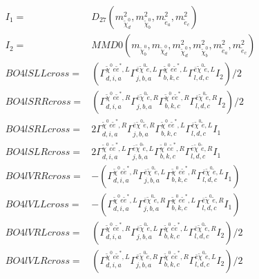 \documentclass[A4,landscape]{article}
\begin{document}
\begin{align} 
I_1 = & D_{27}(m^2_{\tilde{\chi}^0_{{d}}}, m^2_{\tilde{\chi}^0_{{b}}}, m^2_{\tilde{e}_{{a}}}, m^2_{\tilde{e}_{{c}}}) \\ 
I_2 = & MMD0(m_{\tilde{\chi}^0_{{b}}}, m_{\tilde{\chi}^0_{{d}}}, m^2_{\tilde{\chi}^0_{{d}}}, m^2_{\tilde{\chi}^0_{{b}}}, m^2_{\tilde{e}_{{a}}}, m^2_{\tilde{e}_{{c}}}) \\ 
  BO4lSLLcross= & ( \Gamma^{\tilde{\chi}^0 e \tilde{e}^*,L}_{d, i, a} \Gamma^{\bar{e}\tilde{\chi}^0 \tilde{e} ,L}_{j, b, a} \Gamma^{\tilde{\chi}^0 e \tilde{e}^*,L}_{b, k, c} \Gamma^{\bar{e}\tilde{\chi}^0 \tilde{e} ,L}_{l, d, c} I_2)/2 \\ 
  BO4lSRRcross= & ( \Gamma^{\tilde{\chi}^0 e \tilde{e}^*,R}_{d, i, a} \Gamma^{\bar{e}\tilde{\chi}^0 \tilde{e} ,R}_{j, b, a} \Gamma^{\tilde{\chi}^0 e \tilde{e}^*,R}_{b, k, c} \Gamma^{\bar{e}\tilde{\chi}^0 \tilde{e} ,R}_{l, d, c} I_2)/2 \\ 
  BO4lSRLcross= & 2  \Gamma^{\tilde{\chi}^0 e \tilde{e}^*,R}_{d, i, a} \Gamma^{\bar{e}\tilde{\chi}^0 \tilde{e} ,R}_{j, b, a} \Gamma^{\tilde{\chi}^0 e \tilde{e}^*,L}_{b, k, c} \Gamma^{\bar{e}\tilde{\chi}^0 \tilde{e} ,L}_{l, d, c} I_1 \\ 
  BO4lSLRcross= & 2  \Gamma^{\tilde{\chi}^0 e \tilde{e}^*,L}_{d, i, a} \Gamma^{\bar{e}\tilde{\chi}^0 \tilde{e} ,L}_{j, b, a} \Gamma^{\tilde{\chi}^0 e \tilde{e}^*,R}_{b, k, c} \Gamma^{\bar{e}\tilde{\chi}^0 \tilde{e} ,R}_{l, d, c} I_1 \\ 
  BO4lVRRcross= & -( \Gamma^{\tilde{\chi}^0 e \tilde{e}^*,R}_{d, i, a} \Gamma^{\bar{e}\tilde{\chi}^0 \tilde{e} ,L}_{j, b, a} \Gamma^{\tilde{\chi}^0 e \tilde{e}^*,R}_{b, k, c} \Gamma^{\bar{e}\tilde{\chi}^0 \tilde{e} ,L}_{l, d, c} I_1) \\ 
  BO4lVLLcross= & -( \Gamma^{\tilde{\chi}^0 e \tilde{e}^*,L}_{d, i, a} \Gamma^{\bar{e}\tilde{\chi}^0 \tilde{e} ,R}_{j, b, a} \Gamma^{\tilde{\chi}^0 e \tilde{e}^*,L}_{b, k, c} \Gamma^{\bar{e}\tilde{\chi}^0 \tilde{e} ,R}_{l, d, c} I_1) \\ 
  BO4lVRLcross= & ( \Gamma^{\tilde{\chi}^0 e \tilde{e}^*,R}_{d, i, a} \Gamma^{\bar{e}\tilde{\chi}^0 \tilde{e} ,L}_{j, b, a} \Gamma^{\tilde{\chi}^0 e \tilde{e}^*,L}_{b, k, c} \Gamma^{\bar{e}\tilde{\chi}^0 \tilde{e} ,R}_{l, d, c} I_2)/2 \\ 
  BO4lVLRcross= & ( \Gamma^{\tilde{\chi}^0 e \tilde{e}^*,L}_{d, i, a} \Gamma^{\bar{e}\tilde{\chi}^0 \tilde{e} ,R}_{j, b, a} \Gamma^{\tilde{\chi}^0 e \tilde{e}^*,R}_{b, k, c} \Gamma^{\bar{e}\tilde{\chi}^0 \tilde{e} ,L}_{l, d, c} I_2)/2 \\ 

\end{align}
\end{document}
